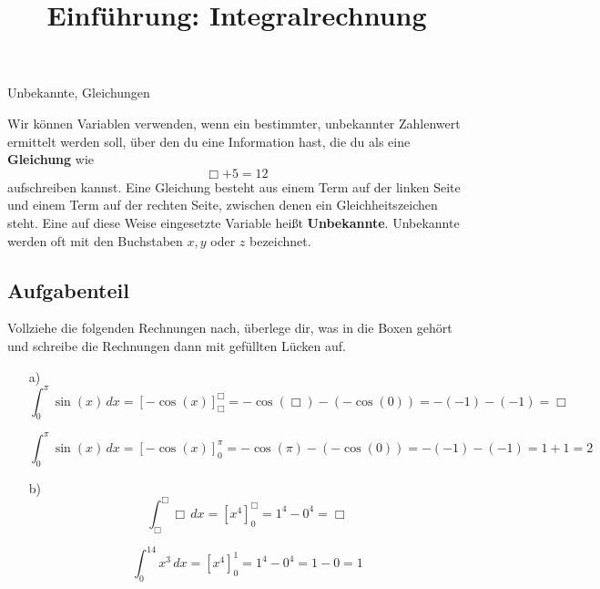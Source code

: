 \documentclass[solution]{uebungsblatt}
\title{Einführung: Integralrechnung}
\begin{document}
\maketitle
\begin{contents}
    Unbekannte, Gleichungen
\end{contents}


\begin{remark}
    Wir können Variablen verwenden, wenn ein bestimmter, unbekannter Zahlenwert ermittelt werden soll, über den du eine Information hast, die du als eine \textbf{Gleichung} wie
    \[\Box+5=12\]
    aufschreiben kannst. Eine Gleichung besteht aus einem Term auf der linken Seite und einem Term auf der rechten Seite, zwischen denen ein Gleichheitszeichen steht. Eine auf diese Weise eingesetzte Variable heißt \textbf{Unbekannte}. Unbekannte werden oft mit den Buchstaben $x,y$ oder $z$ bezeichnet.
\end{remark}

\subsection*{Aufgabenteil}

\begin{exercise}
    Vollziehe die folgenden Rechnungen nach, überlege dir, was in die Boxen gehört und schreibe die Rechnungen dann 
    mit gefüllten Lücken auf.
    \begin{enumerate}
        \item[a)] \[\int_0^\pi\sin(x)\,dx=[-\cos(x)]_\Box^\Box=-\cos(\Box)-(-\cos(0))=-(-1)-(-1)=\Box\]
            \begin{answerbox}[0.5in]
                \[\int_0^\pi\sin(x)\,dx=[-\cos(x)]_0^\pi=-\cos(\pi)-(-\cos(0))=-(-1)-(-1)=1+1=2\]
            \end{answerbox}
        \item[b)] \[\int_\Box^\Box\Box\,dx=[x^4]_0^\Box=1^4-0^4=\Box\]
            \begin{answerbox}[0.5in]
                \[\int_0^14x^3\,dx=[x^4]_0^1=1^4-0^4=1-0=1\]
            \end{answerbox}
\end{enumerate}
\end{exercise}

\end{document}
